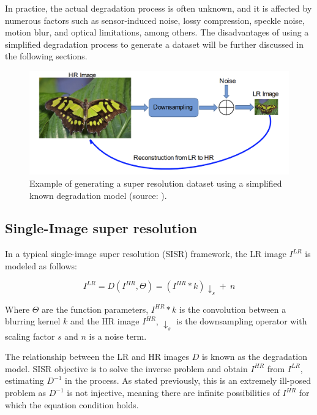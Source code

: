     In practice, the actual degradation process is often unknown, and it is affected by numerous factors such as sensor-induced noise, lossy compression, speckle noise, motion blur, and optical limitations, among others.
    The disadvantages of using a simplified degradation process to generate a dataset will be further discussed in the following sections.

    \begin{figure}[H]
        \centering
        \includegraphics[width=\textwidth]{Includes/3-super-resolution-data.png}
        \caption{Example of generating a super resolution dataset using a simplified known degradation model (source: \cite{bashir2021comprehensive}).}
        \label{fig:3-super-resolution-data}
    \end{figure}

    

    \subsection{Single-Image super resolution}

        In a typical single-image super resolution (SISR) framework, the LR image $I^{LR}$ is modeled as follows:
    
        \begin{equation}
            I^{LR} = D(I^{HR},\Theta) = ( I^{HR} \ast k) \downarrow_s + \ n
            \label{eq:2-degradation-equation}
        \end{equation}
    
        Where $\Theta$ are the function parameters, $I^{HR} \ast k$ is the convolution between a blurring kernel $k$ and the  HR image  $I^{HR}$, $\downarrow_s$ is the downsampling operator with scaling factor $s$ and $n$ is a noise term.
        
        The relationship between the LR and HR images $D$ is known as the degradation model.
        SISR objective is to solve the inverse problem and obtain $I^{HR}$ from $I^{LR}$, estimating $D^{-1}$ in the process. As stated previously, this is an extremely ill-posed problem as $D^{-1}$ is not injective, meaning there are infinite possibilities of $I^{HR}$ for which the equation condition holds. 


